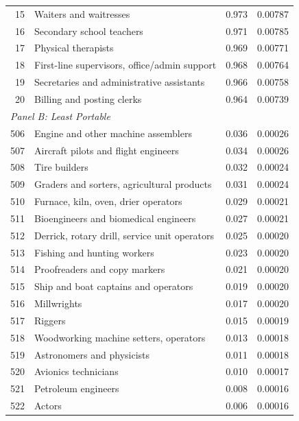 \documentclass[12pt]{article}
\begin{document}
\begin{table}[H]
\begin{tabular}{rlcc}
15 & Waiters and waitresses                        & 0.973 & 0.00787 \\
16 & Secondary school teachers                     & 0.971 & 0.00785 \\
17 & Physical therapists                           & 0.969 & 0.00771 \\
18 & First-line supervisors, office/admin support  & 0.968 & 0.00764 \\
19 & Secretaries and administrative assistants     & 0.966 & 0.00758 \\
20 & Billing and posting clerks                    & 0.964 & 0.00739 \\
\midrule
\multicolumn{4}{l}{\textit{Panel B: Least Portable}} \\
506 & Engine and other machine assemblers          & 0.036 & 0.00026 \\
507 & Aircraft pilots and flight engineers         & 0.034 & 0.00026 \\
508 & Tire builders                                & 0.032 & 0.00024 \\
509 & Graders and sorters, agricultural products   & 0.031 & 0.00024 \\
510 & Furnace, kiln, oven, drier operators         & 0.029 & 0.00021 \\
511 & Bioengineers and biomedical engineers        & 0.027 & 0.00021 \\
512 & Derrick, rotary drill, service unit operators & 0.025 & 0.00020 \\
513 & Fishing and hunting workers                  & 0.023 & 0.00020 \\
514 & Proofreaders and copy markers                & 0.021 & 0.00020 \\
515 & Ship and boat captains and operators         & 0.019 & 0.00020 \\
516 & Millwrights                                  & 0.017 & 0.00020 \\
517 & Riggers                                      & 0.015 & 0.00019 \\
518 & Woodworking machine setters, operators       & 0.013 & 0.00018 \\
519 & Astronomers and physicists                   & 0.011 & 0.00018 \\
520 & Avionics technicians                         & 0.010 & 0.00017 \\
521 & Petroleum engineers                          & 0.008 & 0.00016 \\
522 & Actors                                       & 0.006 & 0.00016 \\

\end{tabular}
\end{table}
\end{document}
